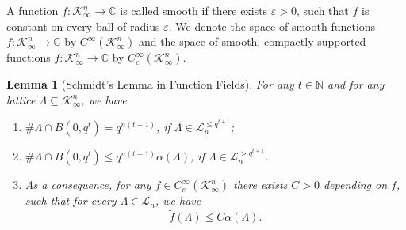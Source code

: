 \documentclass[11pt,a4paper,reqno]{amsart}
\newtheorem{lemma}[theorem]{Lemma}
\theoremstyle{definition}
\theoremstyle{remark}
\numberwithin{equation}{section}
\begin{document}
     A function $f:\mathcal{K}_{\infty}^n\rightarrow\mathbb{C}$ is called smooth if there exists $\varepsilon>0$, such that $f$ is constant on every ball of radius $\varepsilon$. We denote the space of smooth functions $f:\mathcal{K}_{\infty}^n\rightarrow \mathbb{C}$ by $C^{\infty}(\mathcal{K}_{\infty}^n)$ and the space of smooth, compactly supported functions $f:\mathcal{K}_{\infty}^n\rightarrow \mathbb{C}$ by $C^{\infty}_c(\mathcal{K}_{\infty}^n)$.
\begin{lemma}[Schmidt's Lemma in Function Fields]\label{Function Field Schmidt Lemma}
\label{cor:LattPointCnt}
    For any $t\in \mathbb{N}$ and for any lattice $\Lambda\subseteq \mathcal{K}_{\infty}^n$, we have
    \begin{enumerate}
        \item \label{cor:LattPointCntComp} $\#\Lambda\cap B(0,q^t)=q^{n(t+1)}$, if $\Lambda\in \mathcal{L}_n^{\leq q^{t+1}}$;
        \item \label{cor:LattPointCntCusp} $\#\Lambda\cap B(0,q^t)\leq q^{n(t+1)}\alpha(\Lambda)$, if $\Lambda\in \mathcal{L}_n^{>q^{t+1}}$.
        \item \label{lem:SchmidtLem} As a consequence, for any $f\in C_c^{\infty}(\mathcal{K}_{\infty}^n)$ there exists $C>0$ depending on $f$, such that for every $\Lambda\in \mathcal{L}_n$, we have 
    $$\widetilde{f}(\Lambda)\leq C\alpha(\Lambda).$$
    \end{enumerate}
\end{lemma}
\end{document}
